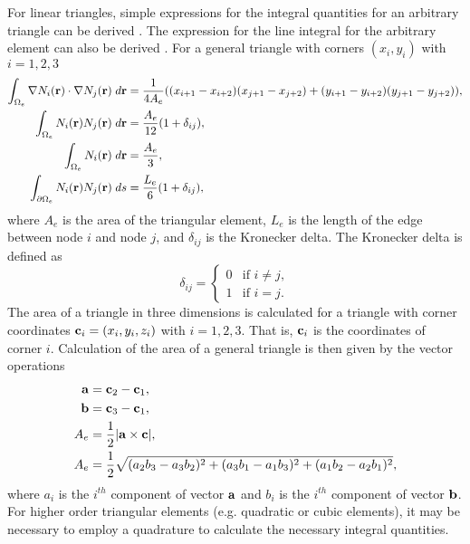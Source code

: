       For linear triangles, simple expressions for the integral quantities for
      an arbitrary triangle can be derived \cite{textbookwhite}. The expression
      for the line integral for the arbitrary element can also be derived
      \cite{textbookjohnson}. For a general triangle with corners $( x_i,y_i )$
      with $i=1,2,3$ %
      \begin{align}
        \int_{\Omega_e} \mathbf{\nabla} N_i(\mathbf{r}) \cdot \mathbf{\nabla} N_j(\mathbf{r}) 
          \;d\mathbf{r} &= \frac{1}{4 A_e}
          ((x_{i+1}-x_{i+2})(x_{j+1}-x_{j+2}) + 
          (y_{i+1}-y_{i+2})(y_{j+1}-y_{j+2})), \\
        \int_{\Omega_e} N_i(\mathbf{r}) N_j(\mathbf{r}) \;d\mathbf{r} &= 
          \frac{A_e}{12} (1+\delta_{ij}), \\
        \int_{\Omega_e} N_i(\mathbf{r}) \;d\mathbf{r} &= \frac{A_e}{3}, \\
        \int_{\partial \Omega_e} N_i(\mathbf{r}) N_j(\mathbf{r}) \;ds &=
          \frac{L_e}{6}(1+\delta_{ij}), 
      \end{align}
      where $A_e$ is the area of the triangular element, $L_e$ is the length of 
      the edge between node $i$ and node $j$, and $\delta_{ij}$ is the Kronecker
      delta.
      The Kronecker delta is defined as
      \begin{equation} \label{eq:kroneker_delta}
        \delta_{ij} =
        \begin{cases}
          0 & \text{if } i \ne j, \\
          1 & \text{if } i = j.
        \end{cases}
      \end{equation}
      The area of a triangle in three dimensions is calculated for a triangle
      with corner coordinates $\mathbf{c}_i = (x_i, y_i, z_i)$ with $i=1,2,3$.
      That is, $\mathbf{c}_i$ is the coordinates of corner $i$. Calculation of the area
      of a general triangle is then given by the vector operations
      \begin{align}
        \mathbf{a} &= \mathbf{c}_2 - \mathbf{c}_1, \\
        \mathbf{b} &= \mathbf{c}_3 - \mathbf{c}_1, \\
        A_e &= \frac{1}{2} \lvert \mathbf{a} \times \mathbf{c} \rvert, \\
        \label{eq:area_triangle}
        A_e &= \frac{1}{2} \sqrt{ (a_2 b_3 - a_3 b_2)^2 + (a_3 b_1 - a_1 b_3)^2 +
          (a_1 b_2 - a_2 b_1)^2},
      \end{align}
      where $a_i$ is the $i^{th}$ component of vector $\mathbf{a}$ and $b_i$ is the
      $i^{th}$ component of vector $\mathbf{b}$.  For higher order triangular elements
      (e.g. quadratic or cubic elements), it may be necessary to employ a
      quadrature to calculate the necessary integral quantities.

